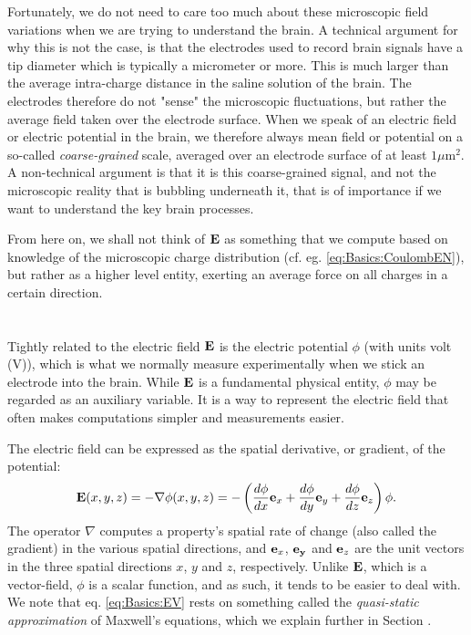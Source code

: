 Fortunately, we do not need to care too much about these microscopic field variations when we are trying to understand the brain. A technical argument for why this is not the case, is that the electrodes used to record brain signals have a tip diameter which is typically a micrometer or more. This is much larger than the average intra-charge distance in the saline solution of the brain. The electrodes therefore do not "sense" the microscopic fluctuations, but rather the average field taken over the electrode surface. When we speak of an electric field or electric potential in the brain, we therefore always mean field or potential on a so-called \textit{coarse-grained} scale, averaged over an electrode surface of at least $1 \mu$m$^2$. A non-technical argument is that it is this coarse-grained signal, and not the microscopic reality that is bubbling underneath it, that is of importance if we want to understand the key brain processes. 

From here on, we shall not think of ${\bf E}$ as something that we compute based on
knowledge of the microscopic charge distribution (cf. eg. \ref{eq:Basics:CoulombEN}), but rather as a higher level entity, exerting an average force on all charges in a certain direction.


\section{}
\label{sec:Basics:Potential} 
Tightly related to the electric field ${\bf E}$ is the electric potential $\phi$ (with units volt (V)), which is what we normally measure experimentally when we stick an electrode into the brain. While ${\bf E}$ is a fundamental physical entity, $\phi$ may be regarded as an auxiliary variable. It is a way to represent the electric field that often makes computations simpler and measurements easier. 

The electric field can be expressed as the spatial derivative, or gradient, of the potential:
\begin{equation}
{\bf E}(x,y,z) = - \nabla \phi(x,y,z) = - \left(\frac{d\phi}{dx} {\bf e}_x  + \frac{d\phi}{dy} {\bf e}_y + \frac{d\phi}{dz} {\bf e}_z \right) \phi.
\label{eq:Basics:EV}
\end{equation}
The operator $\nabla$ computes a property's spatial rate of change (also called the gradient) in the various spatial directions, and ${\bf e}_x$, ${\bf e_y}$ and  ${\bf e}_z$ are the unit vectors in the three spatial directions $x$, $y$ and $z$, respectively. Unlike ${\bf E}$, which is a vector-field, $\phi$ is a scalar function, and as such, it tends to be easier to deal with. We note that eq. \ref{eq:Basics:EV} rests on something called the \textit{quasi-static approximation} of Maxwell's equations, which we explain further in Section \label{sec:Basics:Maxwell}. 


